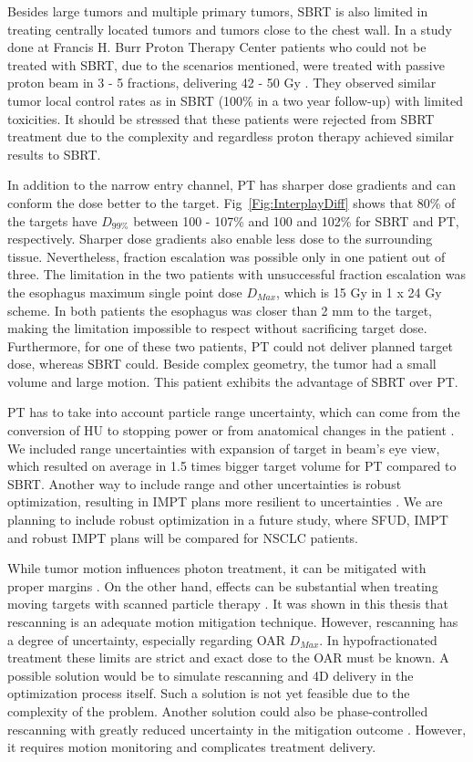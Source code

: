Besides large tumors and multiple primary tumors, SBRT is also limited in treating centrally located tumors and tumors close to the chest wall.
In a study done at Francis H. Burr Proton Therapy Center 
patients who could not be treated with SBRT, due to the scenarios mentioned, were treated with passive proton beam in 3 - 5 fractions, 
delivering 42 - 50 Gy \cite{Westover2012}. They observed similar tumor local control rates as in SBRT (100\% in a two year follow-up) with limited toxicities. 
It should be stressed that these patients were rejected from SBRT treatment due to the complexity and regardless proton therapy achieved similar results
to SBRT.

In addition to the narrow entry channel, PT has sharper dose gradients and can conform the dose better to the target. Fig~\ref{Fig:InterplayDiff} shows that 80\% of the targets have $D_{99\%}$
between 100 - 107\% and 100 and 102\% for SBRT and PT, respectively. Sharper dose gradients also enable less dose to the surrounding tissue. Nevertheless, fraction escalation
was possible only in one patient out of three. The limitation in the two patients with unsuccessful fraction escalation was the esophagus maximum single point dose $D_{Max}$, 
which is 15 Gy in 1 x 24 Gy scheme. In both patients the esophagus was closer than 2 mm to the target, making the limitation impossible to respect without sacrificing target dose.
Furthermore, for one of these two patients, PT could not deliver planned target dose, whereas SBRT could. Beside complex geometry, the tumor had a small volume and 
large motion. This patient exhibits the advantage of SBRT over PT.

PT has to take into account particle range uncertainty, which can come from the conversion of HU to stopping power \cite{Schneider1996}
or from anatomical changes in the patient \cite{Unkelbach2009}. We included range uncertainties with expansion of target in beam's eye view, which resulted on average in 1.5 times bigger
target volume for PT compared to SBRT. Another way to include range and other uncertainties is robust optimization, resulting in IMPT plans more resilient to uncertainties \cite{Unkelbach2009, Chen2012}.
We are planning to include robust optimization in a future study, where SFUD, IMPT and robust IMPT plans will be compared for NSCLC patients.

While tumor motion influences photon treatment, it can be mitigated with proper margins \cite{Zou2014}. 
On the other hand, effects can be substantial when treating moving targets with scanned particle therapy \cite{Bert2008}.
It was shown in this thesis that rescanning is an adequate motion mitigation technique. However, rescanning has a degree of uncertainty, 
especially regarding OAR $D_{Max}$.
In hypofractionated treatment these limits are strict and exact dose to the OAR must be known. 
A possible solution would be to simulate rescanning and 4D delivery in the optimization process itself. 
Such a solution is not yet feasible due to the complexity of the problem. Another solution could also be phase-controlled rescanning with greatly reduced
uncertainty in the mitigation outcome \cite{Mori2013,Takahashi2014}. However,
it requires motion monitoring and complicates treatment delivery.

